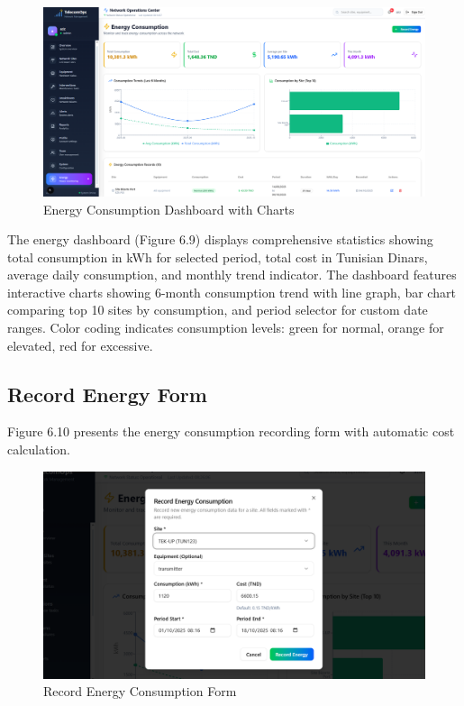\begin{figure}[H]
    \centering
    \includegraphics[width=0.9\linewidth]{img/chap_06/screenshot_energy_dashboard.png}
    \caption{Energy Consumption Dashboard with Charts}
    \label{fig:energy_dashboard}
\end{figure}

The energy dashboard (Figure 6.9) displays comprehensive statistics showing total consumption in kWh for selected period, total cost in Tunisian Dinars, average daily consumption, and monthly trend indicator. The dashboard features interactive charts showing 6-month consumption trend with line graph, bar chart comparing top 10 sites by consumption, and period selector for custom date ranges. Color coding indicates consumption levels: green for normal, orange for elevated, red for excessive.

\subsection{Record Energy Form}

Figure 6.10 presents the energy consumption recording form with automatic cost calculation.

\begin{figure}[H]
    \centering
    \includegraphics[width=0.7\linewidth]{img/chap_06/screenshot_record_energy.png}
    \caption{Record Energy Consumption Form}
    \label{fig:record_energy_form}
\end{figure}

